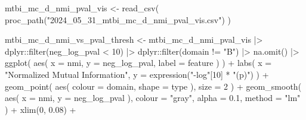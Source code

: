 \documentclass[
  letterpaper,
  DIV=11,
  numbers=noendperiod]{scrreprt}
\newenvironment{Shaded}{\begin{snugshade}}{\end{snugshade}}
\newcommand{\AttributeTok}[1]{\textcolor[rgb]{0.40,0.45,0.13}{#1}}
\newcommand{\DecValTok}[1]{\textcolor[rgb]{0.68,0.00,0.00}{#1}}
\newcommand{\FloatTok}[1]{\textcolor[rgb]{0.68,0.00,0.00}{#1}}
\newcommand{\FunctionTok}[1]{\textcolor[rgb]{0.28,0.35,0.67}{#1}}
\newcommand{\NormalTok}[1]{\textcolor[rgb]{0.00,0.23,0.31}{#1}}
\newcommand{\OtherTok}[1]{\textcolor[rgb]{0.00,0.23,0.31}{#1}}
\newcommand{\SpecialCharTok}[1]{\textcolor[rgb]{0.37,0.37,0.37}{#1}}
\newcommand{\StringTok}[1]{\textcolor[rgb]{0.13,0.47,0.30}{#1}}
\begin{document}
\begin{Shaded}
\begin{Highlighting}[]
\NormalTok{mtbi\_mc\_d\_nmi\_pval\_vis }\OtherTok{\textless{}{-}} \FunctionTok{read\_csv}\NormalTok{(}
    \FunctionTok{proc\_path}\NormalTok{(}\StringTok{"2024\_05\_31\_mtbi\_mc\_d\_nmi\_pval\_vis.csv"}\NormalTok{)}
\NormalTok{)}
\end{Highlighting}
\end{Shaded}

\begin{Shaded}
\begin{Highlighting}[]
\NormalTok{mtbi\_mc\_d\_nmi\_vs\_pval\_thresh }\OtherTok{\textless{}{-}}\NormalTok{ mtbi\_mc\_d\_nmi\_pval\_vis }\SpecialCharTok{|\textgreater{}}
\NormalTok{    dplyr}\SpecialCharTok{::}\FunctionTok{filter}\NormalTok{(neg\_log\_pval }\SpecialCharTok{\textless{}} \DecValTok{10}\NormalTok{) }\SpecialCharTok{|\textgreater{}}
\NormalTok{    dplyr}\SpecialCharTok{::}\FunctionTok{filter}\NormalTok{(domain }\SpecialCharTok{!=} \StringTok{"B"}\NormalTok{) }\SpecialCharTok{|\textgreater{}}
    \FunctionTok{na.omit}\NormalTok{() }\SpecialCharTok{|\textgreater{}}
    \FunctionTok{ggplot}\NormalTok{(}
        \FunctionTok{aes}\NormalTok{(}
            \AttributeTok{x =}\NormalTok{ nmi,}
            \AttributeTok{y =}\NormalTok{ neg\_log\_pval,}
            \AttributeTok{label =}\NormalTok{ feature}
\NormalTok{        )}
\NormalTok{    ) }\SpecialCharTok{+}
    \FunctionTok{labs}\NormalTok{(}
        \AttributeTok{x =} \StringTok{"Normalized Mutual Information"}\NormalTok{,}
        \AttributeTok{y =} \FunctionTok{expression}\NormalTok{(}\StringTok{"{-}log"}\NormalTok{[}\DecValTok{10}\NormalTok{] }\SpecialCharTok{*} \StringTok{"(p)"}\NormalTok{)}
\NormalTok{    ) }\SpecialCharTok{+}
    \FunctionTok{geom\_point}\NormalTok{(}
        \FunctionTok{aes}\NormalTok{(}
            \AttributeTok{colour =}\NormalTok{ domain,}
            \AttributeTok{shape =}\NormalTok{ type}
\NormalTok{        ),}
        \AttributeTok{size =} \DecValTok{2}
\NormalTok{    ) }\SpecialCharTok{+}
    \FunctionTok{geom\_smooth}\NormalTok{(}
        \FunctionTok{aes}\NormalTok{(}
            \AttributeTok{x =}\NormalTok{ nmi,}
            \AttributeTok{y =}\NormalTok{ neg\_log\_pval}
\NormalTok{        ),}
        \AttributeTok{colour =} \StringTok{"gray"}\NormalTok{,}
        \AttributeTok{alpha =} \FloatTok{0.1}\NormalTok{,}
        \AttributeTok{method =} \StringTok{"lm"}
\NormalTok{    ) }\SpecialCharTok{+}
    \FunctionTok{xlim}\NormalTok{(}\DecValTok{0}\NormalTok{, }\FloatTok{0.08}\NormalTok{) }\SpecialCharTok{+}

\end{Highlighting}
\end{Shaded}
\end{document}
